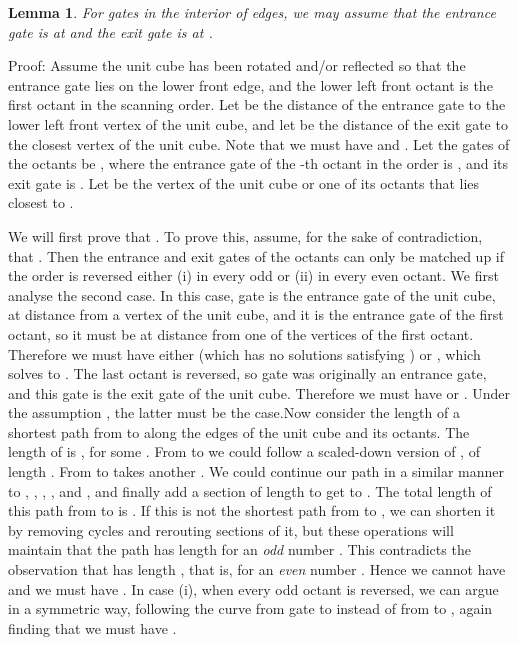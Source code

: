 \documentclass[11pt,a4paper]{article}
\newtheorem{lemma}{Lemma}
\newenvironment{proof}{Proof:}{\qed}
\def\squareforqed{\hbox{\rlap{}}}
\def\qed{\ifmmode\squareforqed\else{\unskip\nobreak\hfil
\penalty50\hskip1em\null\nobreak\hfil\squareforqed
\parfillskip=0pt\finalhyphendemerits=0\endgraf}\fi}
\begin{document}
\begin{lemma}\label{lem:edge-edge-gates}
For gates in the interior of edges, we may assume that the entrance gate is at  and the exit gate is at .
\end{lemma}
\begin{proof}
Assume the unit cube has been rotated and/or reflected so that the entrance gate lies on the lower front edge, and the lower left front octant is the first octant in the scanning order. Let  be the distance of the entrance gate to the lower left front vertex of the unit cube, and let  be the distance of the exit gate to the closest vertex of the unit cube. Note that we must have  and . Let the gates of the octants be , where the entrance gate of the -th octant in the order is , and its exit gate is . Let  be the vertex of the unit cube or one of its octants that lies closest to .

We will first prove that . To prove this, assume, for the sake of contradiction, that . Then the entrance and exit gates of the octants can only be matched up if the order is reversed either (i) in every odd or (ii) in every even octant. We first analyse the second case. In this case, gate  is the entrance gate of the unit cube, at distance  from a vertex of the unit cube, and it is the entrance gate of the first octant, so it must be at distance  from one of the vertices of the first octant. Therefore we must have either  (which has no solutions satisfying ) or , which solves to . The last octant is reversed, so gate  was originally an entrance gate, and this gate is the exit gate of the unit cube. Therefore we must have  or . Under the assumption , the latter must be the case.Now consider the length of a shortest path  from  to  along the edges of the unit cube and its octants. The length of  is , for some . From  to  we could follow a scaled-down version of , of length . From  to  takes another . We could continue our path in a similar manner to , , , ,  and , and finally add a section of length  to get to . The total length of this path from  to  is . If this is not the shortest path from  to , we can shorten it by removing cycles and rerouting sections of it, but these operations will maintain that the path has length  for an \emph{odd} number . This contradicts the observation that  has length , that is,  for an \emph{even} number . Hence we cannot have  and we must have . In case (i), when every odd octant is reversed, we can argue in a symmetric way, following the curve from gate  to  instead of from  to , again finding that we must have .


\end{proof}
\end{document}
